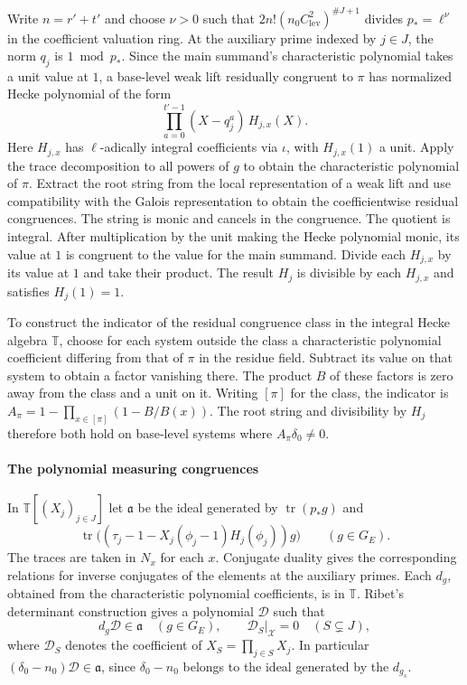 Write \(n=r'+t'\) and choose \(\nu>0\) such that
\(2n!(n_0C_{\mathrm{lev}}^2)^{\#J+1}\) divides \(p_\ast=\ell^\nu\)
in the coefficient valuation ring.
At the auxiliary prime indexed by \(j\in J\), the norm \(q_j\) is
\(1\bmod p_\ast\). Since the main summand's characteristic polynomial
takes a unit value at \(1\), a base-level weak lift residually congruent
to \(\pi\) has normalized Hecke polynomial of the form
\[
  \prod_{a=0}^{t'-1}(X-q_j^a)\,H_{j,x}(X).
\]
Here \(H_{j,x}\) has \(\ell\)-adically integral coefficients
via \(\iota\), with \(H_{j,x}(1)\) a unit. Apply the trace
decomposition to all powers of \(g\) to obtain the characteristic
polynomial of \(\pi\). Extract the root string from the local
representation of a weak lift and use compatibility with the
Galois representation to obtain the coefficientwise residual
congruences. The string is monic and cancels in the congruence.
The quotient is integral. After multiplication by the unit
making the Hecke polynomial monic, its value at \(1\) is
congruent to the value for the main summand. Divide each \(H_{j,x}\) by
its value at \(1\) and take their product. The result \(H_j\) is
divisible by each \(H_{j,x}\) and satisfies \(H_j(1)=1\).

To construct the indicator of the residual congruence class in
the integral Hecke algebra \(\mathbb T\), choose for each system
outside the class a characteristic polynomial coefficient differing
from that of \(\pi\) in the residue field. Subtract its value on
that system to obtain a factor vanishing there. The product \(B\)
of these factors is zero away from the class and a unit on it.
Writing \([\pi]\) for the class, the indicator is
\(A_\pi=1-\prod_{x\in[\pi]}(1-B/B(x))\).
The root string and divisibility by \(H_j\) therefore both hold
on base-level systems where \(A_\pi\delta_0\ne0\).

\paragraph{The polynomial measuring congruences}
In \(\mathbb T[(X_j)_{j\in J}]\) let \(\mathfrak a\) be the ideal
generated by \(\operatorname{tr}(p_\ast g)\) and
\[
 \operatorname{tr}\bigl((\tau_j-1-
         X_j(\phi_j-1)H_j(\phi_j))g\bigr)\qquad (g\in G_E).
\]
The traces are taken in \(N_x\) for each \(x\). Conjugate duality
gives the corresponding relations for inverse conjugates of the
elements at the auxiliary primes. Each \(d_g\), obtained from the
characteristic polynomial coefficients, is in \(\mathbb T\).
Ribet's determinant construction gives a polynomial \(\mathcal D\)
such that
\[
 d_g\mathcal D\in\mathfrak a\quad(g\in G_E),\qquad
 \mathcal D_S\big|_{\mathcal X}=0\quad(S\subsetneq J),
\]
where \(\mathcal D_S\) denotes the coefficient of
\(X_S=\prod_{j\in S}X_j\).
In particular \((\delta_0-n_0)\mathcal D\in\mathfrak a\),
since \(\delta_0-n_0\) belongs to the ideal generated by the \(d_{g_s}\).

